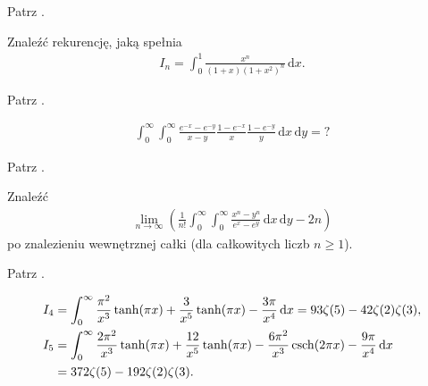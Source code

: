 
\begin{solution}
    Patrz \cite[s. 17]{valean19}.
\end{solution}

\begin{problem_with_solution}
    \label{valean_1_32}%
    Znaleźć rekurencję, jaką spełnia
    \begin{align}
        I_n = \int_0^1 \frac{x^n}{(1+x)(1+x^2)^n} \,\mathrm{d}x.
    \end{align} 
\end{problem_with_solution}


\begin{solution}
    Patrz \cite[s. 21, 22]{valean19}.
\end{solution}

\begin{problem_with_solution}
    \label{valean_1_37}%
    \begin{align}
        \int_0^\infty \int_0^\infty \frac {e^{-x}-e^{-y}}{x-y} \frac{1-e^{-x}}{x} \frac{1-e^{-y}}{y} \,\mathrm{d}x \,\mathrm{d}y = ?
    \end{align} 
\end{problem_with_solution}

\begin{solution}
    Patrz \cite[s. ?????]{valean19}.
\end{solution}


\begin{problem_with_solution}
    \label{valean_1_38}%
    Znaleźć
    \begin{align}
        \lim_{n\to\infty} \left(\frac{1}{n!} \int_0^\infty \int_0^\infty \frac{x^n - y^n}{e^x - e^y} \,\mathrm{d}x \,\mathrm{d}y - 2n\right)
    \end{align} 
    po znalezieniu wewnętrznej całki (dla całkowitych liczb $n \ge 1$).
\end{problem_with_solution}

\begin{solution}
    Patrz \cite[s. ?????]{valean19}.
\end{solution}

\begin{problem_with_solution}
    \label{valean_1_40}%
    \begin{align}
        I_4 & = \int_0^\infty \frac{\pi^2}{x^3} \tanh (\pi x)  + \frac{3}{x^5} \tanh(\pi x) - \frac{3\pi}{x^4} \,\mathrm{d}x = 93 \zeta(5) - 42 \zeta(2) \zeta(3), \\
        I_5 & = \int_0^\infty \frac{2\pi^2}{x^3} \tanh(\pi x) + \frac{12}{x^5} \tanh (\pi x) - \frac{6 \pi^2}{x^3} \operatorname{csch} (2 \pi x) - \frac{9 \pi}{x^4} \,\mathrm{d} x \\
        & = 372 \zeta(5) - 192 \zeta(2)\zeta(3).
    \end{align} 
\end{problem_with_solution}

